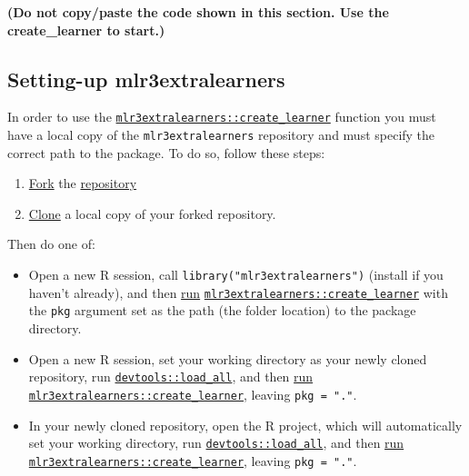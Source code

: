 \documentclass[
]{scrbook}
\providecommand{\tightlist}{%
  \setlength{\itemsep}{0pt}\setlength{\parskip}{0pt}}
\begin{document}
\textbf{(Do not copy/paste the code shown in this section. Use the create\_learner to start.)}

\hypertarget{setup}{%
\subsection{Setting-up mlr3extralearners}\label{setup}}

In order to use the \href{https://mlr3extralearners.mlr-org.com/reference/create_learner.html}{\texttt{mlr3extralearners::create\_learner}} function you must have a local copy of the \texttt{mlr3extralearners} repository and must specify the correct path to the package. To do so, follow these steps:

\begin{enumerate}
\def\labelenumi{\arabic{enumi}.}
\tightlist
\item
  \href{https://docs.github.com/en/free-pro-team@latest/github/getting-started-with-github/fork-a-repo}{Fork} the \href{https://github.com/mlr-org/mlr3extralearners}{repository}
\item
  \href{https://docs.github.com/en/free-pro-team@latest/github/creating-cloning-and-archiving-repositories/cloning-a-repository}{Clone} a local copy of your forked repository.
\end{enumerate}

Then do one of:

\begin{itemize}
\tightlist
\item
  Open a new R session, call \texttt{library("mlr3extralearners")} (install if you haven't already), and then \protect\hyperlink{create-learner}{run} \href{https://mlr3extralearners.mlr-org.com/reference/create_learner.html}{\texttt{mlr3extralearners::create\_learner}} with the \texttt{pkg} argument set as the path (the folder location) to the package directory.
\item
  Open a new R session, set your working directory as your newly cloned repository, run \href{https://www.rdocumentation.org/packages/devtools/topics/load_all}{\texttt{devtools::load\_all}}, and then \protect\hyperlink{create-learner}{run} \href{https://mlr3extralearners.mlr-org.com/reference/create_learner.html}{\texttt{mlr3extralearners::create\_learner}}, leaving \texttt{pkg\ =\ "."}.
\item
  In your newly cloned repository, open the R project, which will automatically set your working directory, run \href{https://www.rdocumentation.org/packages/devtools/topics/load_all}{\texttt{devtools::load\_all}}, and then \protect\hyperlink{create-learner}{run} \href{https://mlr3extralearners.mlr-org.com/reference/create_learner.html}{\texttt{mlr3extralearners::create\_learner}}, leaving \texttt{pkg\ =\ "."}.
\end{itemize}
\end{document}
